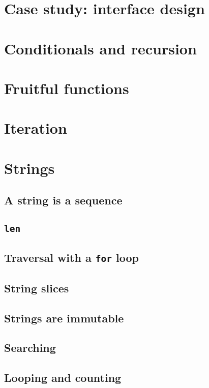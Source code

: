 \documentclass{article}
\begin{document}
\section{Case study: interface design}
\section{Conditionals and recursion}
\section{Fruitful functions}
\section{Iteration}
\newpage%
\section{Strings}
\subsection{A string is a sequence}
\subsection{\texttt{len}}
\subsection{Traversal with a \texttt{for} loop}
\subsection{String slices}
\subsection{Strings are immutable}
\subsection{Searching}
\subsection{Looping and counting}
\end{document}
